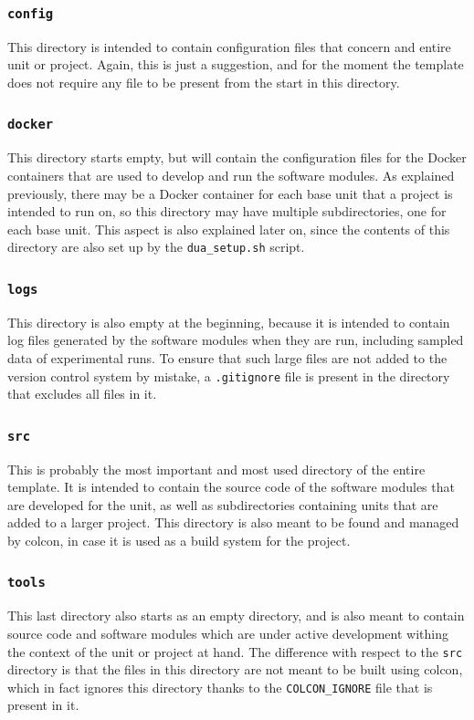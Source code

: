 \subsubsection{\texttt{config}}
\label{sec:dua_template_layout_config}
This directory is intended to contain configuration files that concern and entire unit or project. Again, this is just a suggestion, and for the moment the template does not require any file to be present from the start in this directory.

\subsubsection{\texttt{docker}}
\label{sec:dua_template_layout_docker}
This directory starts empty, but will contain the configuration files for the Docker containers that are used to develop and run the software modules. As explained previously, there may be a Docker container for each base unit that a project is intended to run on, so this directory may have multiple subdirectories, one for each base unit. This aspect is also explained later on, since the contents of this directory are also set up by the \texttt{dua\_setup.sh} script.

\subsubsection{\texttt{logs}}
\label{sec:dua_template_layout_logs}
This directory is also empty at the beginning, because it is intended to contain log files generated by the software modules when they are run, including sampled data of experimental runs. To ensure that such large files are not added to the version control system by mistake, a \texttt{.gitignore} file is present in the directory that excludes all files in it.

\subsubsection{\texttt{src}}
\label{sec:dua_template_layout_src}
This is probably the most important and most used directory of the entire template. It is intended to contain the source code of the software modules that are developed for the unit, as well as subdirectories containing units that are added to a larger project. This directory is also meant to be found and managed by colcon, in case it is used as a build system for the project.

\subsubsection{\texttt{tools}}
\label{sec:dua_template_layout_tools}
This last directory also starts as an empty directory, and is also meant to contain source code and software modules which are under active development withing the context of the unit or project at hand. The difference with respect to the \texttt{src} directory is that the files in this directory are not meant to be built using colcon, which in fact ignores this directory thanks to the \texttt{COLCON\_IGNORE} file that is present in it.

